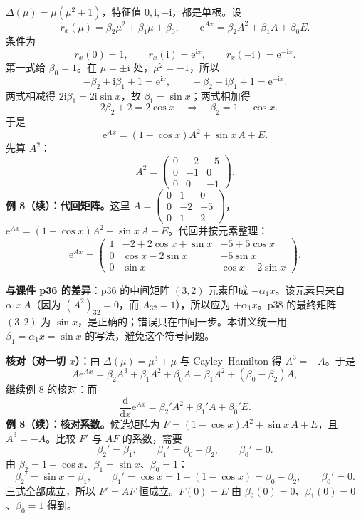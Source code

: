 \documentclass[11pt]{ctexart}
\let\basesubhdr\subhdr
\renewcommand{\subhdr}[1]{\needspace{8\baselineskip}\basesubhdr{#1}}
\newcommand{\mat}[1]{\begin{pmatrix}#1\end{pmatrix}}
\newcommand{\ee}{\mathrm{e}}
\begin{document}
\label{ex:7:end}
\label{ex:8:start}

\qbreak\qstem{（课件 p36--p38 例 8）设
\[
A=\mat{0&1&0\\0&-2&-5\\0&1&2},
\]
求 $\ee^{Ax}$。}

$\Delta(\mu)=\mu(\mu^2+1)$，特征值 $0,\mathrm{i},-\mathrm{i}$，都是单根。设
\[
r_x(\mu)=\beta_2\mu^2+\beta_1\mu+\beta_0,\qquad \ee^{Ax}=\beta_2A^2+\beta_1A+\beta_0E .
\]
条件为
\[
r_x(0)=1,\qquad r_x(\mathrm{i})=\ee^{\mathrm{i}x},\qquad r_x(-\mathrm{i})=\ee^{-\mathrm{i}x}.
\]
第一式给 $\beta_0=1$。在 $\mu=\pm\mathrm{i}$ 处，$\mu^2=-1$，所以
\[
-\beta_2+\mathrm{i}\beta_1+1=\ee^{\mathrm{i}x},\qquad
-\beta_2-\mathrm{i}\beta_1+1=\ee^{-\mathrm{i}x}.
\]
两式相减得 $2\mathrm{i}\beta_1=2\mathrm{i}\sin x$，故 $\beta_1=\sin x$；两式相加得
\[
-2\beta_2+2=2\cos x\quad\Longrightarrow\quad \beta_2=1-\cos x .
\]
于是
\[
\ee^{Ax}=(1-\cos x)A^2+\sin x\,A+E .
\]
先算 $A^2$：
\[
A^2=\mat{0&-2&-5\\0&-1&0\\0&0&-1}.
\]
\textbf{例 8（续）：代回矩阵。}这里 $A=\left(\begin{smallmatrix}0&1&0\\0&-2&-5\\0&1&2\end{smallmatrix}\right)$，$\ee^{Ax}=(1-\cos x)A^2+\sin x\,A+E$。代回并按元素整理：
\[
\ee^{Ax}=\mat{
1& -2+2\cos x+\sin x& -5+5\cos x\\
0& \cos x-2\sin x& -5\sin x\\
0& \sin x& \cos x+2\sin x}.
\]

\textbf{与课件 p36 的差异}：p36 的中间矩阵 $(3,2)$ 元素印成 $-\alpha_1x$。该元素只来自 $\alpha_1x\,A$（因为 $(A^2)_{32}=0$，而 $A_{32}=1$），所以应为 $+\alpha_1x$。p38 的最终矩阵 $(3,2)$ 为 $\sin x$，是正确的；错误只在中间一步。本讲义统一用 $\beta_1=\alpha_1x=\sin x$ 的写法，避免这个符号问题。

\textbf{核对（对一切 $x$）}：由 $\Delta(\mu)=\mu^3+\mu$ 与 Cayley--Hamilton 得 $A^3=-A$。于是
\[
A\ee^{Ax}=\beta_2A^3+\beta_1A^2+\beta_0A
=\beta_1A^2+(\beta_0-\beta_2)A,
\]
继续例 8 的核对：而
\[
\frac{\mathrm{d}}{\mathrm{d}x}\ee^{Ax}=\beta_2'A^2+\beta_1'A+\beta_0'E.
\]
\textbf{例 8（续）：核对系数。}候选矩阵为 $F=(1-\cos x)A^2+\sin x\,A+E$，且 $A^3=-A$。比较 $F'$ 与 $AF$ 的系数，需要
\[
\beta_2'=\beta_1,\qquad \beta_1'=\beta_0-\beta_2,\qquad \beta_0'=0 .
\]
由 $\beta_2=1-\cos x$、$\beta_1=\sin x$、$\beta_0=1$：
\[
\beta_2'=\sin x=\beta_1,\qquad
\beta_1'=\cos x=1-(1-\cos x)=\beta_0-\beta_2,\qquad
\beta_0'=0 .
\]
三式全部成立，所以 $F'=AF$ 恒成立。$F(0)=E$ 由 $\beta_2(0)=0$、$\beta_1(0)=0$、$\beta_0=1$ 得到。
\end{document}
